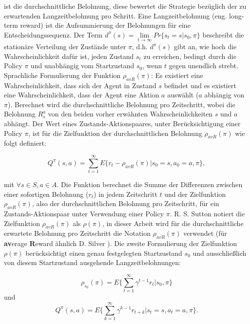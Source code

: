 \documentclass[conference]{IEEEtran}
\begin{document}
ist die durchschnittliche Belohnung, diese bewertet die Strategie bezüglich der zu erwartenden Langzeitbelohnung pro Schritt. Eine Langzeitbelohnung (eng. long-term reward) ist die Aufsummierung der Belohnungen für eine Entscheidungssequenz. Der Term $d^\pi(s) = \lim\limits_{t \rightarrow \infty} Pr\{s_t = s|s_0,\pi\}$ beschreibt die stationäre Verteilung der Zustände unter $\pi$, d.h. $d^\pi(s)$ gibt an, wie hoch die Wahrscheinlichkeit dafür ist, jeden Zustand $s_t$ zu erreichen, bedingt durch die Policy $\pi$ und unabhängig vom Startzustand $s_0$, wenn $t$ gegen unendlich strebt. Sprachliche Formulierung der Funktion $\rho_{avR}(\pi)$: Es existiert eine Wahrscheinlichkeit, dass sich der Agent in Zustand $s$ befindet und es existiert eine Wahrscheinlichkeit, dass der Agent eine Aktion $a$ auswählt ($a$ abhängig von $\pi$). Berechnet wird die durchschnittliche Belohnung pro Zeitschritt, wobei die Belohnung $R^a_s$ von den beiden vorher erwähnten Wahrscheinlichkeiten $s$ und $a$ abhängt. Der Wert eines Zustands-Aktionspaares, unter Berücksichtigung einer Policy $\pi$, ist für die Zielfunktion der durchschnittlichen Belohnung $\rho_{avR}(\pi)$ wie folgt definiert:

\begin{equation*}
Q^\pi(s,a) = \sum^\infty_{t=1} E\{r_t - \rho_{avR}(\pi)|s_0 = s, a_0 = a, \pi\},
\end{equation*}

mit $\forall s \in S, a \in A$. Die Funktion berechnet die Summe der Differenzen zwischen einer sofortigen Belohnung ($r_t$) in jedem Zeitschritt $t$ und der Zielfunktion $\rho_{avR}(\pi)$, also der durchschnittlichen Belohnung pro Zeitschritt, für ein Zustands-Aktionspaar unter Verwendung einer Policy $\pi$. R. S. Sutton notiert die Zielfunktion $\rho_{avR}(\pi)$ als $\rho(\pi)$, in dieser Arbeit wird für die durchschnittliche erwartete Belohnung pro Zeitschritt die Notation $\rho_{avR}(\pi)$ verwendet (für \textbf{av}erage \textbf{R}eward ähnlich D. Silver \cite{silver_15}). Die zweite Formulierung der Zielfunktion $\rho(\pi)$ berücksichtigt einen genau festgelegten Startzustand $s_0$ und ausschließlich von diesem Startzustand ausgehende Langzeitbelohnungen:

\begin{equation*}
\rho_{s_0}(\pi) = E\{\sum^\infty_{t=1} \gamma^{t-1} r_t | s_0,\pi \}
\end{equation*}
und
\begin{equation*}
Q^\pi (s,a) = E \{\sum^\infty_{k=1} \gamma^{k-1} r_{t+k} | s_t = s, a_t = a, \pi\}.
\end{equation*}
\end{document}
